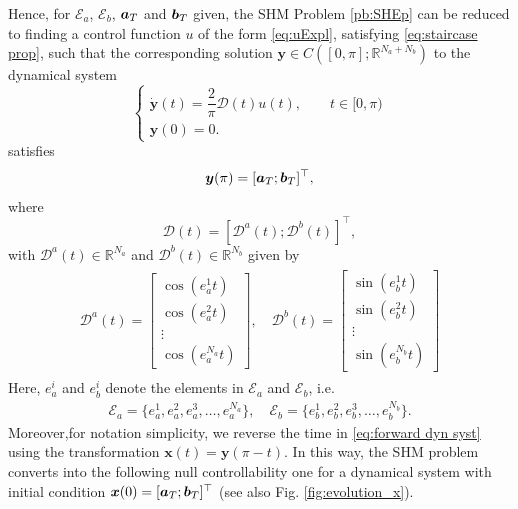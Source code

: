 \documentclass[twocolumn]{autart}    %
\begin{document}
Hence, for $\mathcal{E}_a$, $\mathcal{E}_b$, $\bm{a}_T$ and $\bm{b}_T$ given, the SHM Problem \ref{pb:SHEp} can be reduced to finding a control function $u$ of the form \eqref{eq:uExpl}, satisfying \eqref{eq:staircase prop}, such that the corresponding solution $\bm{y} \in C([0,\pi]; \mathbb{R}^{N_a+N_b})$ to the dynamical system
\begin{equation}\label{eq:forward dyn syst}
	\begin{cases}
		\dot{\bm{y}}(t) = \dfrac{2}{\pi} \bm{\mathcal{D}}(t) u(t), \qquad  t\in [0,\pi)
		\\[5pt]
		\bm{y}(0) = 0.
	\end{cases}
\end{equation}
satisfies
\begin{align*}
	\bm{y} (\pi) = [\bm{a}_T;\bm{b}_T]^\top,	
\end{align*}
where
\begin{equation}\label{eq:Dynamics}
	\bm{\mathcal{D}}(t) = \left[ \bm{\mathcal{D}}^a(t); \bm{\mathcal{D}}^b(t) \right]^\top, 
\end{equation}
with $\bm{\mathcal{D}}^a(t) \in \mathbb{R}^{N_a} $ and $ \bm{\mathcal{D}}^b(t) \in \mathbb{R}^{N_b}$ given by
\begin{gather}\label{eq:DalphaDbeta}
    \begin{align}
        \bm{\mathcal{D}}^a(t) = 
        \begin{bmatrix} 
            \cos(e_a^1t) \\ \cos(e_a^2t) \\ \vdots \\ \cos(e_a^{N_a}t) 
        \end{bmatrix},
        \quad \bm{\mathcal{D}}^b(t) = 
        \begin{bmatrix} 
            \sin(e_b^1t) \\ \sin(e_b^2t) \\ \vdots \\ \sin(e_b^{N_b}t)
        \end{bmatrix} 
    \end{align} 
\end{gather}
Here, $e_a^i$ and $e_b^i$  denote the elements in $\mathcal{E}_a$ and  $\mathcal{E}_b$, i.e.
\begin{align*}
	\mathcal{E}_a = \{e_a^1,e_a^2,e_a^3,\dots,e_a^{N_a}\}, \quad \mathcal{E}_b = \{e_b^1,e_b^2,e_b^3,\dots,e_b^{N_b}\}.
\end{align*}
Moreover,for notation simplicity, we reverse the time in \eqref{eq:forward dyn syst} using the transformation $\bm{x} (t) = \bm{y}(\pi - t)$. In this way, the SHM problem converts into the following null controllability one for a dynamical system with initial condition $\bm{x}(0) = [\bm{a}_T; \bm{b}_T]^\top$ (see also Fig. \ref{fig:evolution_x}).
\end{document}
